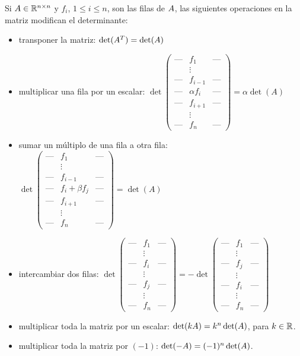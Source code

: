 \begin{proposicion} Si $\Ab \in  \R^{n \times n}$ y $f_i$, $1 \le i \le n$, son las filas de $\Ab$, las siguientes operaciones en la matriz modifican el determinante:
\begin{itemize}
\item transponer la matriz: $\det(\Ab^T) = \det(\Ab)$
\item multiplicar una fila por un escalar: $\det\begin{pmatrix} \text{---} & f_1 & \text{---}\\ & \vdots & \\ \text{---} & f_{i-1} & \text{---}\\ \text{---} & \alpha f_i & \text{---}\\ \text{---} & f_{i+1} & \text{---} \\ & \vdots & \\ \text{---} & f_n  & \text{---}\end{pmatrix} = \alpha \det(A)$
\item sumar un múltiplo de una fila a otra fila: $\det\begin{pmatrix} \text{---} & f_1 & \text{---}\\ & \vdots & \\ \text{---} & f_{i-1} & \text{---}\\ \text{---} & f_i + \beta f_j & \text{---}\\ \text{---} & f_{i+1} & \text{---} \\ & \vdots & \\ \text{---} & f_n  & \text{---}\end{pmatrix} = \det(A)$
\item intercambiar dos filas: $\det\begin{pmatrix} \text{---} & f_1   & \text{---}\\ & \vdots   & \\ \text{---} & f_{i}   & \text{---}\\ & \vdots & \\ \text{---} & f_{j}   & \text{---}\\  & \vdots   & \\ \text{---} & f_n   & \text{---} \end{pmatrix} = - \det\begin{pmatrix} \text{---} & f_1   & \text{---}\\ & \vdots   & \\ \text{---} & f_{j}   & \text{---}\\ & \vdots & \\ \text{---} & f_{i}   & \text{---}\\  & \vdots   & \\ \text{---} & f_n   & \text{---} \end{pmatrix}$
\item multiplicar toda la matriz por un escalar: $\det(k\Ab)=k^n \det(\Ab)$, para $k \in \mathbb R$.
\item multiplicar toda la matriz por $(-1)$: $\det(-\Ab)=(-1)^n \det(\Ab)$.
\end{itemize}
\end{proposicion}

